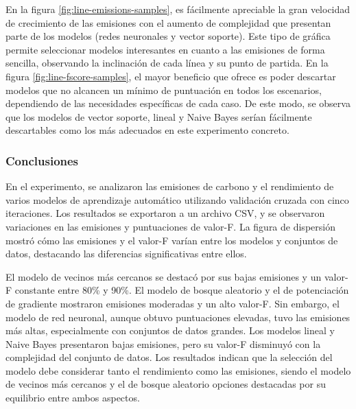 En la figura \ref{fig:line-emissions-samples}, es fácilmente apreciable la gran velocidad de crecimiento de las emisiones con el aumento de complejidad que presentan parte de los modelos (redes neuronales y vector soporte). Este tipo de gráfica permite seleccionar modelos interesantes en cuanto a las emisiones de forma sencilla, observando la inclinación de cada línea y su punto de partida. En la figura \ref{fig:line-fscore-samples}, el mayor beneficio que ofrece es poder descartar modelos que no alcancen un mínimo de puntuación en todos los escenarios, dependiendo de las necesidades específicas de cada caso. De este modo, se observa que los modelos de vector soporte, lineal y Naive Bayes serían fácilmente descartables como los más adecuados en este experimento concreto. 


\subsubsection{Conclusiones}

En el experimento, se analizaron las emisiones de carbono y el rendimiento de varios modelos de aprendizaje automático utilizando validación cruzada con cinco iteraciones. Los resultados se exportaron a un archivo CSV, y se observaron variaciones en las emisiones y puntuaciones de valor-F. La figura de dispersión mostró cómo las emisiones y el valor-F varían entre los modelos y conjuntos de datos, destacando las diferencias significativas entre ellos.

El modelo de vecinos más cercanos se destacó por sus bajas emisiones y un valor-F constante entre 80\% y 90\%. El modelo de bosque aleatorio y el de potenciación de gradiente mostraron emisiones moderadas y un alto valor-F. Sin embargo, el modelo de red neuronal, aunque obtuvo puntuaciones elevadas, tuvo las emisiones más altas, especialmente con conjuntos de datos grandes. Los modelos lineal y Naive Bayes presentaron bajas emisiones, pero su valor-F disminuyó con la complejidad del conjunto de datos. Los resultados indican que la selección del modelo debe considerar tanto el rendimiento como las emisiones, siendo el modelo de vecinos más cercanos y el de bosque aleatorio opciones destacadas por su equilibrio entre ambos aspectos.



